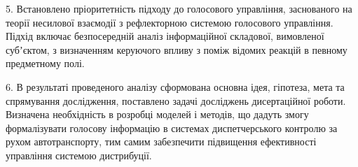 5. Встановлено пріоритетність підходу до голосового управління, заснованого на теорії несилової взаємодії з рефлекторною системою голосового управління. Підхід включає безпосередній аналіз інформаційної складової, вимовленої субʼєктом, з визначенням керуючого впливу з поміж відомих реакцій в певному предметному полі.

6. В результаті проведеного аналізу сформована основна ідея, гіпотеза, мета та спрямування дослідження, поставлено задачі досліджень дисертаційної роботи. Визначена необхідність в розробці моделей і методів, що дадуть змогу формалізувати голосову інформацію в системах диспетчерського контролю за рухом автотранспорту, тим самим забезпечити підвищення ефективності управління системою дистрибуції.

